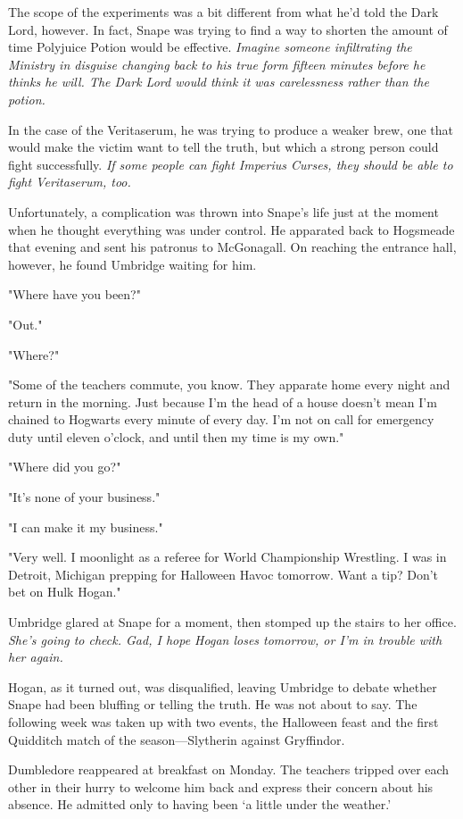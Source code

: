 The scope of the experiments was a bit different from what he'd told the Dark Lord, however. In fact, Snape was trying to find a way to shorten the amount of time Polyjuice Potion would be effective. \emph{Imagine someone infiltrating the Ministry in disguise changing back to his true form fifteen minutes before he thinks he will. The Dark Lord would think it was carelessness rather than the potion.}

In the case of the Veritaserum, he was trying to produce a weaker brew, one that would make the victim want to tell the truth, but which a strong person could fight successfully. \emph{If some people can fight Imperius Curses, they should be able to fight Veritaserum, too.}

Unfortunately, a complication was thrown into Snape's life just at the moment when he thought everything was under control. He apparated back to Hogsmeade that evening and sent his patronus to McGonagall. On reaching the entrance hall, however, he found Umbridge waiting for him.

"Where have you been?"

"Out."

"Where?"

"Some of the teachers commute, you know. They apparate home every night and return in the morning. Just because I'm the head of a house doesn't mean I'm chained to Hogwarts every minute of every day. I'm not on call for emergency duty until eleven o'clock, and until then my time is my own."

"Where did you go?"

"It's none of your business."

"I can make it my business."

"Very well. I moonlight as a referee for World Championship Wrestling. I was in Detroit, Michigan prepping for Halloween Havoc tomorrow. Want a tip? Don't bet on Hulk Hogan."

Umbridge glared at Snape for a moment, then stomped up the stairs to her office. \emph{She's going to check. Gad, I hope Hogan loses tomorrow, or I'm in trouble with her again.}

Hogan, as it turned out, was disqualified, leaving Umbridge to debate whether Snape had been bluffing or telling the truth. He was not about to say. The following week was taken up with two events, the Halloween feast and the first Quidditch match of the season—Slytherin against Gryffindor.

Dumbledore reappeared at breakfast on Monday. The teachers tripped over each other in their hurry to welcome him back and express their concern about his absence. He admitted only to having been `a little under the weather.'

